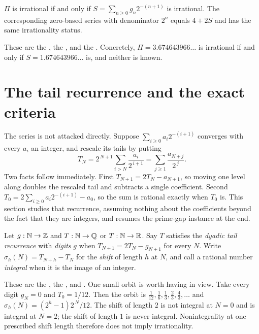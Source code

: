 \documentclass[11pt]{article}
\begin{document}
\begin{corollary}\label{long251:res:irr-equivalence}
$\Pi$ is irrational if and only if $S=\sum_{n\ge0}g_n2^{-(n+1)}$ is irrational.
The corresponding zero-based series with denominator $2^n$ equals $4+2S$ and
has the same irrationality status.
\end{corollary}

\noindent These are the
, the
, and the
.  Concretely, $\Pi=3.674643966\ldots$ is irrational
if and only if $S=1.674643966\ldots$ is, and neither is known.

\section{The tail recurrence and the exact criteria}\label{long251:sec:tail}

The series is not attacked directly.  Suppose $\sum_{i\ge0}a_i2^{-(i+1)}$
converges with every $a_i$ an integer, and rescale its tails by putting
\[
 T_N=2^{\,N+1}\sum_{i>N}\frac{a_i}{2^{\,i+1}}
    =\sum_{j\ge1}\frac{a_{N+j}}{2^{\,j}} .
\]
Two facts follow immediately.  First $T_{N+1}=2T_N-a_{N+1}$, so moving one
level along doubles the rescaled tail and subtracts a single coefficient.
Second $T_0=2\sum_{i\ge0}a_i2^{-(i+1)}-a_0$, so the sum is rational exactly
when $T_0$ is.  This section studies that recurrence, assuming nothing about
the coefficients beyond the fact that they are integers, and resumes the
prime-gap instance at the end.

\begin{definition}\label{long251:def:rec}
Let $g:\mathbb{N}\to\mathbb{Z}$ and $T:\mathbb{N}\to\mathbb{Q}$ or $T:\mathbb{N}\to\mathbb{R}$.  Say $T$ satisfies the
\emph{dyadic tail recurrence} with \emph{digits} $g$ when
$T_{N+1}=2T_N-g_{N+1}$ for every $N$.  Write $\sigma_h(N)=T_{N+h}-T_N$ for the
\emph{shift} of length $h$ at $N$, and call a rational number \emph{integral}
when it is the image of an integer.
\end{definition}

\noindent These are the
, the
, and
.
One small orbit is worth having in view.  Take every digit $g_N=0$ and
$T_0=1/12$.  Then the orbit is
$\tfrac1{12},\tfrac16,\tfrac13,\tfrac23,\tfrac43,\ldots$ and
$\sigma_h(N)=(2^{h}-1)2^{\,N}/12$.  The shift of length $2$ is not integral at
$N=0$ and is integral at $N=2$; the shift of length $1$ is never integral.
Nonintegrality at one prescribed shift length therefore does not imply
irrationality.
\end{document}

